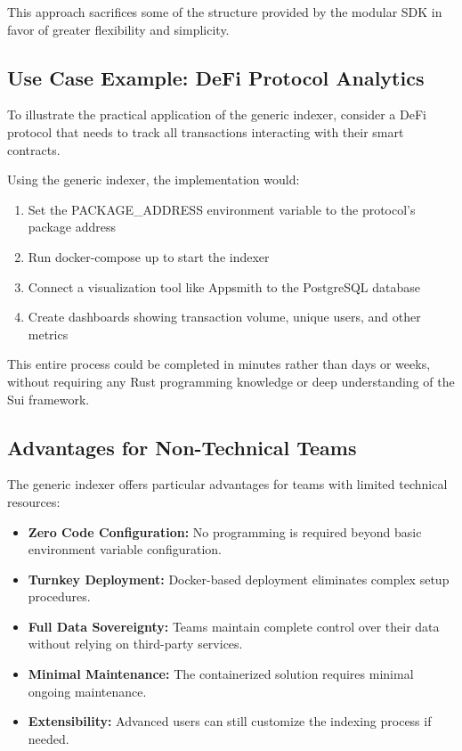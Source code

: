 This approach sacrifices some of the structure provided by the modular SDK in favor of greater flexibility and simplicity.

\subsection{Use Case Example: DeFi Protocol Analytics}

To illustrate the practical application of the generic indexer, consider a DeFi protocol that needs to track all transactions interacting with their smart contracts.

Using the generic indexer, the implementation would:

\begin{enumerate}
    \item Set the PACKAGE\_ADDRESS environment variable to the protocol's package address
    \item Run docker-compose up to start the indexer
    \item Connect a visualization tool like Appsmith to the PostgreSQL database
    \item Create dashboards showing transaction volume, unique users, and other metrics
\end{enumerate}

This entire process could be completed in minutes rather than days or weeks, without requiring any Rust programming knowledge or deep understanding of the Sui framework.

\subsection{Advantages for Non-Technical Teams}

The generic indexer offers particular advantages for teams with limited technical resources:

\begin{itemize}
    \item \textbf{Zero Code Configuration:} No programming is required beyond basic environment variable configuration.
    \item \textbf{Turnkey Deployment:} Docker-based deployment eliminates complex setup procedures.
    \item \textbf{Full Data Sovereignty:} Teams maintain complete control over their data without relying on third-party services.
    \item \textbf{Minimal Maintenance:} The containerized solution requires minimal ongoing maintenance.
    \item \textbf{Extensibility:} Advanced users can still customize the indexing process if needed.
\end{itemize}

